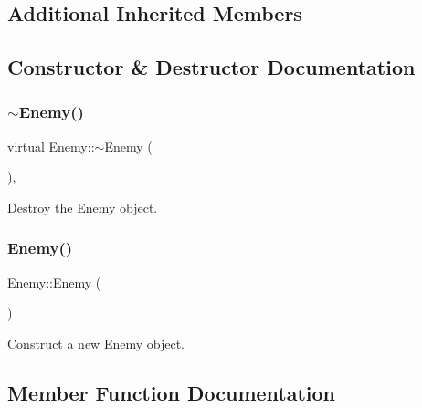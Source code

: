 \subsection*{Additional Inherited Members}


\subsection{Constructor \& Destructor Documentation}
\mbox{\label{classEnemy_aafb628c66008e33afdd750e2f492bd98}} 
\subsubsection{\texorpdfstring{$\sim$Enemy()}{~Enemy()}}
{\footnotesize\ttfamily virtual Enemy\+::$\sim$\+Enemy (\begin{DoxyParamCaption}{ }\end{DoxyParamCaption})\hspace{0.3cm}{\ttfamily [virtual]}, {\ttfamily [default]}}



Destroy the \mbox{\hyperlink{classEnemy}{Enemy}} object. 

\mbox{\label{classEnemy_a94f30d348b6d2840fd71675472ba38dd}} 
\subsubsection{\texorpdfstring{Enemy()}{Enemy()}}
{\footnotesize\ttfamily Enemy\+::\+Enemy (\begin{DoxyParamCaption}{ }\end{DoxyParamCaption})\hspace{0.3cm}{\ttfamily [protected]}}



Construct a new \mbox{\hyperlink{classEnemy}{Enemy}} object. 



\subsection{Member Function Documentation}
\mbox{\label{classEnemy_a5f7ddbe448758f4a8eef7d846903ce99}} 
